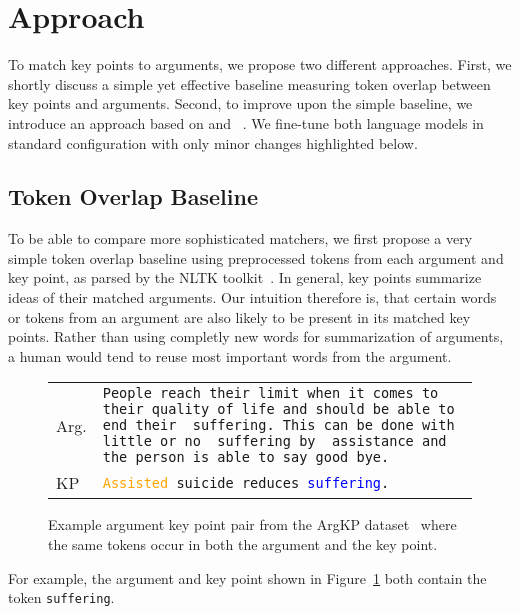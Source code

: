 \section{Approach}\label{approach}

To match key points to arguments, we propose two different approaches.
First, we shortly discuss a simple yet effective baseline measuring token overlap between key points and arguments.
Second, to improve upon the simple baseline, we introduce an approach based on \Bert and \Roberta~\cite{DevlinCLT2019,LiuOGDJCLLZS2019}. We fine-tune both language models in standard configuration with only minor changes highlighted below.

\subsection{Token Overlap Baseline}
To be able to compare more sophisticated matchers, we first propose a very simple token overlap baseline using preprocessed tokens from each argument and key point, as parsed by the NLTK toolkit~\cite{BirdL2004}. 
In general, key points summarize ideas of their matched arguments.
Our intuition therefore is, that certain words or tokens from an argument are also likely to be present in its matched key points.
Rather than using completly new words for summarization of arguments, a human would tend to reuse most important words from the argument.
\begin{figure}
    \begin{tabularx}{\linewidth}{@{}lX@{}}
        Arg. & \texttt{People reach their limit when it comes to their quality of life and should be able to end their {\color{blue} suffering}. This can be done with little or no {\color{blue} suffering} by {\color{orange} assistance} and the person is able to say good bye.} \\
        KP & \texttt{\textcolor{orange}{Assisted} suicide reduces \textcolor{blue}{suffering}.}
    \end{tabularx}
    \caption{Example argument key point pair from the ArgKP dataset~\cite{Bar-HaimEFKLS2020} where the same tokens occur in both the argument and the key point.}
    \label{example-overlap}
\end{figure}
For example, the argument and key point shown in Figure~\ref{example-overlap} both contain the token \texttt{suffering}.


